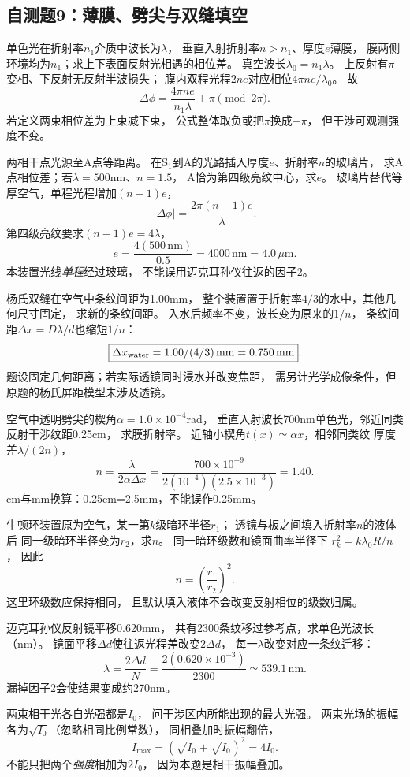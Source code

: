 \subsection{自测题9：薄膜、劈尖与双缝填空}

\problemtext 单色光在折射率$n_1$介质中波长为$\lambda$，
垂直入射折射率$n>n_1$、厚度$e$薄膜，
膜两侧环境均为$n_1$；求上下表面反射光相遇的相位差。
\workings
真空波长$\lambda_0=n_1\lambda$。
上反射有$\pi$变相、下反射无反射半波损失；
膜内双程光程$2ne$对应相位$4\pi ne/\lambda_0$。
故
\[
\boxed{\Delta\phi=\frac{4\pi ne}{n_1\lambda}+\pi
\pmod{2\pi}}.
\]
\crosscheck 若定义两束相位差为上束减下束，
公式整体取负或把$\pi$换成$-\pi$，
但干涉可观测强度不变。

\problemtext 两相干点光源至A点等距离。
在S$_1$到A的光路插入厚度$e$、折射率$n$的玻璃片，
求A点相位差；若$\lambda=500$nm、$n=1.5$，
A恰为第四级亮纹中心，求$e$。
\workings
玻璃片替代等厚空气，单程光程增加$(n-1)e$，
\[
\boxed{|\Delta\phi|=\frac{2\pi(n-1)e}{\lambda}}.
\]
第四级亮纹要求$(n-1)e=4\lambda$，
\[
\boxed{e=\frac{4(500\,\mathrm{nm})}{0.5}
=4000\,\mathrm{nm}=4.0\,\mu\mathrm m}.
\]
\crosscheck 本装置光线\emph{单程}经过玻璃，
不能误用迈克耳孙仪往返的因子2。

\problemtext 杨氏双缝在空气中条纹间距为1.00mm，
整个装置置于折射率$4/3$的水中，其他几何尺寸固定，
求新的条纹间距。
\workings
入水后频率不变，波长变为原来的$1/n$，
条纹间距$\Delta x=D\lambda/d$也缩短$1/n$：
\[
\boxed{\Delta x_{\rm water}=1.00/(4/3)\,\mathrm{mm}
=0.750\,\mathrm{mm}}.
\]
\crosscheck 题设固定几何距离；若实际透镜同时浸水并改变焦距，
需另计光学成像条件，但原题的杨氏屏距模型未涉及透镜。

\problemtext 空气中透明劈尖的楔角$\alpha=1.0\times10^{-4}$rad，
垂直入射波长700nm单色光，邻近同类反射干涉纹距0.25cm，
求膜折射率。
\workings
近轴小楔角$t(x)\simeq\alpha x$，相邻同类纹
厚度差$\lambda/(2n)$，
\[
\boxed{n=\frac{\lambda}{2\alpha\Delta x}
=\frac{700\times10^{-9}}{2(10^{-4})(2.5\times10^{-3})}
=1.40}.
\]
\crosscheck cm与mm换算：0.25cm=2.5mm，不能误作0.25mm。

\problemtext 牛顿环装置原为空气，某一第$k$级暗环半径$r_1$；
透镜与板之间填入折射率$n$的液体后
同一级暗环半径变为$r_2$，求$n$。
\workings
同一暗环级数和镜面曲率半径下
$r_k^2=k\lambda_0R/n$，
因此
\[
\boxed{n=\left(\frac{r_1}{r_2}\right)^2}.
\]
\crosscheck 这里环级数应保持相同，
且默认填入液体不会改变反射相位的级数归属。

\problemtext 迈克耳孙仪反射镜平移0.620mm，
共有2300条纹移过参考点，求单色光波长（nm）。
\workings
镜面平移$\Delta d$使往返光程差改变$2\Delta d$，
每一$\lambda$改变对应一条纹迁移：
\[
\boxed{\lambda=\frac{2\Delta d}{N}
=\frac{2(0.620\times10^{-3})}{2300}
\simeq539.1\,\mathrm{nm}}.
\]
\crosscheck 漏掉因子2会使结果变成约270nm。

\problemtext 两束相干光各自光强都是$I_0$，
问干涉区内所能出现的最大光强。
\workings
两束光场的振幅各为$\sqrt{I_0}$（忽略相同比例常数），
同相叠加时振幅翻倍，
\[
\boxed{I_{\max}=(\sqrt{I_0}+\sqrt{I_0})^2=4I_0}.
\]
\crosscheck 不能只把两个\emph{强度}相加为$2I_0$，
因为本题是相干振幅叠加。
